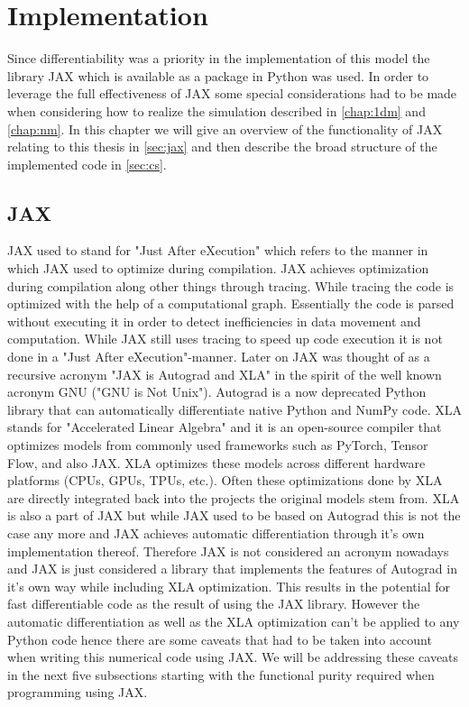 \documentclass[a4paper, oneside]{discothesis}
\begin{document}
							\chapter{Implementation} \label{chap:impl}
							Since differentiability was a priority in the implementation of this model the library JAX which is available as a package in Python was used.
							In order to leverage the full effectiveness of JAX some special considerations had to be made when considering how to realize the simulation described in \autoref{chap:1dm} and \autoref{chap:nm}.
							In this chapter we  will give an overview of the functionality of JAX relating to this thesis in \autoref{sec:jax} and then describe the broad structure of the implemented code in \autoref{sec:cs}.


							\section{JAX} \label{sec:jax}
							JAX used to stand for "Just After eXecution" which refers to the manner in which JAX used to optimize during compilation.
							JAX achieves optimization during compilation along other things through tracing.
							While tracing the code is optimized with the help of a computational graph.
							Essentially the code is parsed without executing it in order to detect inefficiencies in data movement and computation.
							While JAX still uses tracing to speed up code execution it is not done in a "Just After eXecution"-manner.
							Later on JAX was thought of as a recursive acronym "JAX is Autograd and XLA" in the spirit of the well known acronym GNU ("GNU is Not Unix").
							Autograd is a now deprecated Python library that can automatically differentiate native Python and NumPy code.
							XLA stands for "Accelerated Linear Algebra" and it is an open-source compiler that optimizes models from commonly used frameworks such as PyTorch, Tensor Flow, and also JAX.
							XLA optimizes these models across different hardware platforms (CPUs, GPUs, TPUs, etc.).
							Often these optimizations done by XLA are directly integrated back into the projects the original models stem from.
							XLA is also a part of JAX but while JAX used to be based on Autograd this is not the case any more and JAX achieves automatic differentiation through it's own implementation thereof.
							Therefore JAX is not considered an acronym nowadays and JAX is just considered a library that implements the features of Autograd in it's own way while including XLA optimization.
							This results in the potential for fast differentiable code as the result of using the JAX library.
							However the automatic differentiation as well as the XLA optimization can't be applied to any Python code hence there are some caveats that had to be taken into account when writing this numerical code using JAX.
							We will be addressing these caveats in the next five subsections starting with the functional purity required when programming using JAX.
\end{document}
